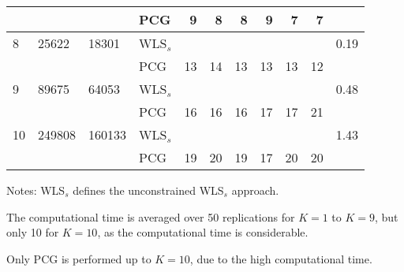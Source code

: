 \documentclass[twocolumn]{svjour3}
\begin{document}
\begin{table*}[ht]
\begin{threeparttable}
\begin{tabular}{llllrrrrrrr}
		& & & PCG & 9 & 8 & 8 & 9 & 7 & 7 & \bm{$2.09$} \\
		\midrule
		8 & 25622 & 18301 & WLS$_{s}$ & & & & & & & 0.19 \\
		& & & PCG & 13 & 14 & 13 & 13 & 13 & 12 & \bm{$19.08$} \\
		\midrule
		9 & 89675 & 64053 & WLS$_{s}$ & & & & & & & 0.48 \\
		& & & PCG & 16 & 16 & 16 & 17 & 17 & 21 & \bm{$244.68$} \\
		\midrule
		10 & 249808 & 160133 & WLS$_{s}$ & & & & & & & 1.43 \\
		& & & PCG & 19 & 20 & 19 & 17 & 20 & 20 & \bm{$1660.12$} \\
		\bottomrule
	\end{tabular}
	\begin{tablenotes}
	\item [] Notes: WLS$_{s}$ defines the unconstrained WLS$_{s}$ approach.
	\item [] The computational time is averaged over 50 replications for $K = 1$ to $K = 9$, but only 10 for $K = 10$, as the computational time is considerable.
	\item [] Only PCG is performed up to $K = 10$, due to the high computational time.
	\end{tablenotes}
\end{threeparttable}
\end{table*}
\end{document}
